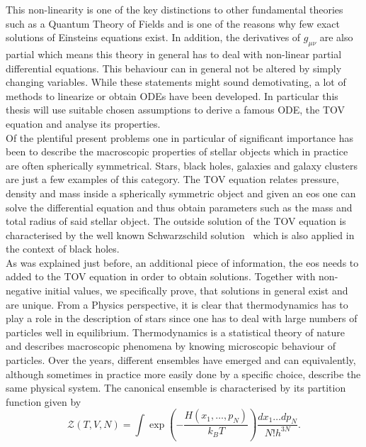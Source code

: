 This non-linearity is one of the key distinctions to other fundamental theories such as a Quantum Theory of Fields and is one of the reasons why few exact solutions of Einsteins equations exist.
In addition, the derivatives of $g_{\mu\nu}$ are also partial which means this theory in general has to deal with non-linear partial differential equations.
This behaviour can in general not be altered by simply changing variables.
While these statements might sound demotivating, a lot of methods to linearize or obtain \acp{ODE} have been developed.
In particular this thesis will use suitable chosen assumptions to derive a famous \ac{ODE}, the \ac{TOV} equation and analyse its properties.\\
%
Of the plentiful present problems one in particular of significant importance has been to describe the macroscopic properties of stellar objects which in practice are often spherically symmetrical.
Stars, black holes, galaxies and galaxy clusters are just a few examples of this category.
The \ac{TOV} equation relates pressure, density and mass inside a spherically symmetric object and given an \ac{eos} one can solve the differential equation and thus obtain parameters such as the mass and total radius of said stellar object.
The outside solution of the \ac{TOV} equation is characterised by the well known Schwarzschild solution~\cite{schwarzschildUberGravitationsfeldMassenpunktes1916} which is also applied in the context of black holes.\\
As was explained just before, an additional piece of information, the \ac{eos} needs to added to the \ac{TOV} equation in order to obtain solutions.
Together with non-negative initial values, we specifically prove, that solutions in general exist and are unique.
From a Physics perspective, it is clear that thermodynamics has to play a role in the description of stars since one has to deal with large numbers of particles well in equilibrium.
Thermodynamics is a statistical theory of nature and describes macroscopic phenomena by knowing microscopic behaviour of particles.
Over the years, different ensembles have emerged and can equivalently, although sometimes in practice more easily done by a specific choice, describe the same physical system.
The canonical ensemble is characterised by its partition function given by
\begin{equation}
	\mathcal{Z}(T,V,N) = \int\exp\left(-\frac{H(x_1,\dots,p_N)}{k_B T}\right)\frac{dx_1\dots dp_N}{N!h^{3N}}.
	\label{eq:01-Intr-Canocnical-Ens-Part-Funct}
\end{equation}

